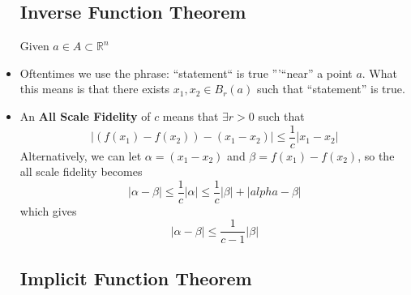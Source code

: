 \begin{itemize}
    \subsection{Inverse Function Theorem}
    \begin{theorem}
        Given $a\in A \subset \mathbb{R}^n$
    \end{theorem}
    \item Oftentimes we use the phrase: ``statement`` is true '''``near'' a point $a$. What this means is that there exists $x_1,x_2 \in B_r(a)$ such that ``statement'' is true.
    \item An \textbf{All Scale Fidelity} of $c$ means that $\exists r > 0$ such that 
    \begin{equation}
        |(f(x_1)-f(x_2))-(x_1-x_2)| \le \frac{1}{c} |x_1-x_2|
    \end{equation}
    Alternatively, we can let $\alpha = (x_1-x_2)$ and $\beta=f(x_1)-f(x_2)$, so the all scale fidelity becomes 
    \begin{equation}
        |\alpha-\beta| \le \frac{1}{c} |\alpha| \le \frac{1}{c}|\beta| + |alpha-\beta|
    \end{equation}
    which gives
    \begin{equation}
        |\alpha-\beta| \le \frac{1}{c-1}|\beta|
    \end{equation}
    \subsection{Implicit Function Theorem}

\end{itemize}